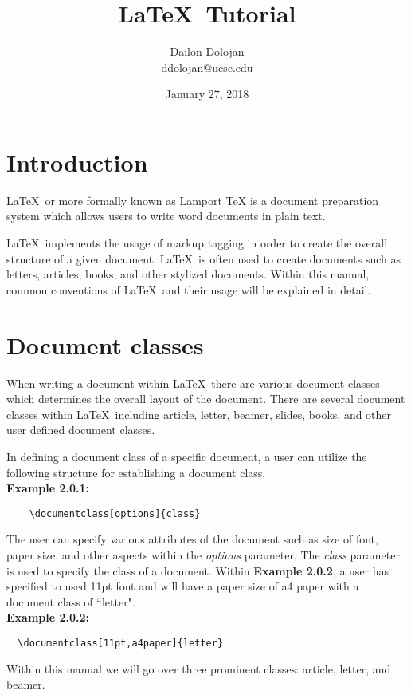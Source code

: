 \documentclass[11pt,twocolumn]{article}
\title{\LaTeX\ Tutorial}
\author{Dailon Dolojan \\ ddolojan@ucsc.edu}
\date{January 27, 2018}
\begin{document}
\maketitle 

\section{Introduction}
\LaTeX\ or more formally known as Lamport TeX is a document preparation system which allows users to write word documents in plain text. 
\par \LaTeX\ implements the usage of markup tagging in order to create the overall structure of a given document. \LaTeX\ is often used to create documents such as letters, articles, books, and other stylized documents. Within this manual, common conventions of \LaTeX\ and their usage will be explained in detail.

\section{Document classes}
\indent When writing a document within \LaTeX\, there are various document classes which determines the overall layout of the document. There are several document classes within \LaTeX\ including article, letter, beamer, slides, books, and other user defined document classes.
\par In defining a document class of a specific document, a user can utilize the following structure for establishing a document class.\\

\noindent \textbf{Example 2.0.1:}
\begin{verbatim}
    \documentclass[options]{class}
\end{verbatim}

The user can specify various attributes of the document such as size of font, paper size, and other aspects within the \textit{options} parameter. The \textit{class} parameter is used to specify the class of a document. Within \textbf{Example 2.0.2}, a user has specified to used 11pt font and will have a paper size of a4 paper with a document class of ``letter".\\

\noindent \textbf{Example 2.0.2:}

\begin{verbatim}
  \documentclass[11pt,a4paper]{letter}
\end{verbatim}

Within this manual we will go over three prominent classes: article, letter, and beamer.
\end{document}
